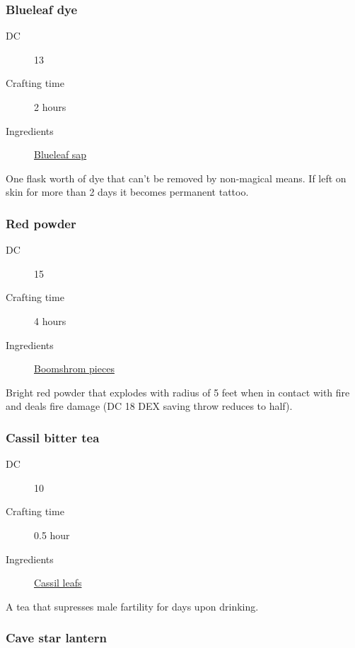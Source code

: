 \subsubsection{Blueleaf dye}
\label{Blueleaf dye}

\begin{description}
\item [DC] 13
\item [Crafting time] 2 hours
\item [Ingredients] \hyperref[Blueleaf]{Blueleaf sap}
\end{description}

One flask worth of dye that can't be removed by non-magical means. 
If left on skin for more than 2 days it becomes permanent tattoo.

\subsubsection{Red powder}
\label{Red powder}

\begin{description}
\item [DC] 15
\item [Crafting time] 4 hours
\item [Ingredients] \hyperref[Boomsrhoom]{Boomshrom pieces}
\end{description}

Bright red powder that explodes with radius of 5 feet when in contact with fire and deals  fire damage (DC 18 DEX saving throw reduces to half).

\subsubsection{Cassil bitter tea}
\label{Cassil bitter tea}

\begin{description}
\item [DC] 10
\item [Crafting time] 0.5 hour
\item [Ingredients] \hyperref[Cassil]{Cassil leafs}
\end{description}

A tea that supresses male fartility for  days upon drinking.

\subsubsection{Cave star lantern}
\label{Cave star lantern}

